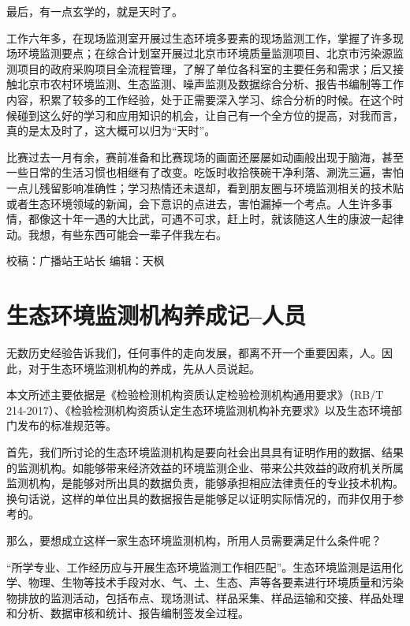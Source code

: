 \documentclass[
]{book}
\begin{document}
最后，有一点玄学的，就是天时了。

工作六年多，在现场监测室开展过生态环境多要素的现场监测工作，掌握了许多现场环境监测要点；在综合计划室开展过北京市环境质量监测项目、北京市污染源监测项目的政府采购项目全流程管理，了解了单位各科室的主要任务和需求；后又接触北京市农村环境监测、生态监测、噪声监测及数据综合分析、报告书编制等工作内容，积累了较多的工作经验，处于正需要深入学习、综合分析的时候。在这个时候碰到这么好的学习和应用知识的机会，让自己有一个全方位的提高，对我而言，真的是太及时了，这大概可以归为``天时''。

比赛过去一月有余，赛前准备和比赛现场的画面还屡屡如动画般出现于脑海，甚至一些日常的生活习惯也相继有了改变。吃饭时收拾筷碗干净利落、涮洗三遍，害怕一点儿残留影响准确性；学习热情还未退却，看到朋友圈与环境监测相关的技术贴或者生态环境领域的新闻，会下意识的点进去，害怕漏掉一个考点。人生许多事情，都像这十年一遇的大比武，可遇不可求，赶上时，就该随这人生的康波一起律动。我想，有些东西可能会一辈子伴我左右。

校稿：广播站王站长
编辑：天枫

\hypertarget{ux751fux6001ux73afux5883ux76d1ux6d4bux673aux6784ux517bux6210ux8bb0ux4ebaux5458}{%
\section{生态环境监测机构养成记--人员}\label{ux751fux6001ux73afux5883ux76d1ux6d4bux673aux6784ux517bux6210ux8bb0ux4ebaux5458}}

无数历史经验告诉我们，任何事件的走向发展，都离不开一个重要因素，人。因此，对于生态环境监测机构的养成，先从人员说起。

本文所述主要依据是《检验检测机构资质认定检验检测机构通用要求》（RB/T 214-2017）、《检验检测机构资质认定生态环境监测机构补充要求》以及生态环境部门发布的标准规范等。

首先，我们所讨论的生态环境监测机构是要向社会出具具有证明作用的数据、结果的监测机构。如能够带来经济效益的环境监测企业、带来公共效益的政府机关所属监测机构，是能够对所出具的数据负责，能够承担相应法律责任的专业技术机构。换句话说，这样的单位出具的数据报告是能够足以证明实际情况的，而非仅用于参考的。

那么，要想成立这样一家生态环境监测机构，所用人员需要满足什么条件呢？

``所学专业、工作经历应与开展生态环境监测工作相匹配''。生态环境监测是运用化学、物理、生物等技术手段对水、气、土、生态、声等各要素进行环境质量和污染物排放的监测活动，包括布点、现场测试、样品采集、样品运输和交接、样品处理和分析、数据审核和统计、报告编制签发全过程。
\end{document}
